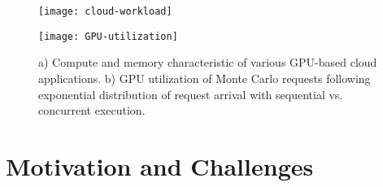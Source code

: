 \label{fig:prob}
\begin{center}
\begin{figure*}[h]
\begin{center}
\begin{minipage}{0.49\textwidth}
\texttt{[image: cloud-workload]}
\end{minipage}
\begin{minipage}{0.49\textwidth}
\texttt{[image: GPU-utilization]}
\end{minipage}
\caption{\small a) Compute and memory characteristic of various GPU-based cloud
applications.  b) GPU utilization of Monte Carlo requests following exponential
distribution of request arrival with sequential vs. concurrent execution.}
\label{fig:cloud}
\end{center}	
\end{figure*}
\end{center}
\section{Motivation and Challenges}
